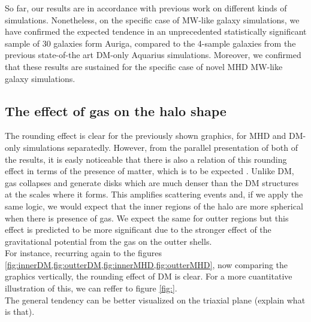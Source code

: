 So far, our results are in accordance with previous work on different kinds of simulations. Nonetheless, on the specific case of MW-like galaxy simulations, we have confirmed the expected tendence in an unprecedented statistically significant sample of 30 galaxies form Auriga, compared to the 4-sample galaxies from the previous state-of-the art DM-only Aquarius simulations. Moreover, we confirmed that these results are sustained for the specific case of novel MHD MW-like galaxy simulations.\\

\subsection{The effect of gas on the halo shape}
The rounding effect is clear for the previously shown graphics, for MHD and DM-only simulations separatedly. However, from the parallel presentation of both of the results, it is easly noticeable that there is also a relation of this rounding effect in terms of the presence of matter, which is to be expected \cite{effect of gas}. Unlike DM, gas collapses and generate disks which are much denser than the DM structures at the scales where it forms. This amplifies scattering events and, if we apply the same logic, we would expect that the inner regions of the halo are more spherical when there is presence of gas. We expect the same for outter regions but this effect is predicted to be more significant due to the stronger effect of the gravitational potential from the gas on the outter shells.\\

For instance, recurring again to the figures \ref{fig:innerDM,fig:outterDM,fig:innerMHD,fig:outterMHD}, now comparing the graphics vertically, the rounding effect of DM is clear. For a more cuantitative illustration of this, we can reffer to figure \ref{fig:}. \\


The general tendency can be better visualized on the triaxial plane (explain what is that).

